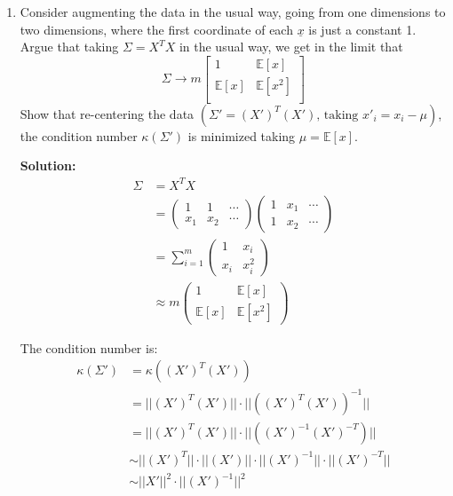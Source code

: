\documentclass[letter, 12pt]{article}
\begin{document}
\begin{enumerate}
    	\item{Consider augmenting the data in the usual way, going from one dimensions to two dimensions, where the first coordinate of each $ \underline{x} $ is just a constant 1. Argue that taking $ \Sigma = X^T X $ in the usual way, we get in the limit that
    	\[	\Sigma \rightarrow m
    		\begin{bmatrix}
    		1 & \mathbb{E}[x] \\
    		\mathbb{E}[x] & \mathbb{E}[x^2]\\
    		\end{bmatrix}
    	\]
    	Show that re-centering the data $ (\Sigma' = (X' )^T (X' ) \text{, taking } x'_i = x_i - \mu) $, the condition number $ \kappa(\Sigma' ) $ is
    	minimized taking $ \mu = \mathbb{E}[x] $.
    	}
    	\par{\textbf{Solution:}}
    	\begin{align*}
    		\Sigma &= X^T X \\
    		&= \begin{pmatrix}
    		1 & 1 & \cdots \\
    		x_1 & x_2 & \cdots 
    		\end{pmatrix} 
    		\begin{pmatrix}
    		1 & x_1 & \cdots \\
    		1 & x_2 & \cdots 
    		\end{pmatrix} \\
    		&= \sum_{i=1}^{m} 
    		\begin{pmatrix}
    		1 & x_i \\
    		x_i & x_i^2
    		\end{pmatrix} \\
    		&\approx m
    		\begin{pmatrix}
    		1 & \mathbb{E}[x] \\
    		\mathbb{E}[x] & \mathbb{E}[x^2]
    		\end{pmatrix} 
    	\end{align*}
    	\par{The condition number is: }
    	\begin{align*}
    		\kappa(\Sigma') &= \kappa((X' )^T (X' )) \\
    		&= ||(X' )^T (X' )|| \cdot ||((X' )^T (X' ))^{-1}|| \\
    		&= ||(X' )^T (X' )|| \cdot ||((X' )^{-1}(X' )^{-T} )|| \\
    		&\sim ||(X' )^T|| \cdot || (X' )|| \cdot ||(X' )^{-1}|| \cdot ||(X' )^{-T} || \\
    		&\sim ||X'||^2 \cdot ||(X' )^{-1}||^2 \\

\end{align*}
\end{enumerate}
\end{document}
